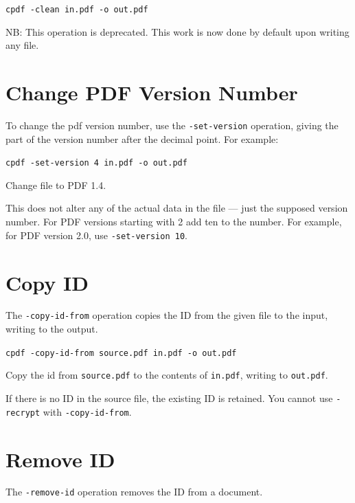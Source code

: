 \documentclass{book}
\begin{document}
  \begin{framed}
  \small\noindent\verb!cpdf -clean in.pdf -o out.pdf!
  \end{framed}

\noindent NB: This operation is deprecated. This work is now done by default upon writing any file.

   \section{Change PDF Version Number}
   \label{setversion}
   To change the pdf version number, use the \texttt{-set-version} operation,
giving the part of the version number after the decimal point. For example:

  \begin{framed}
  \small\noindent\verb!cpdf -set-version 4 in.pdf -o out.pdf!

  \vspace{2.5mm}
  \noindent Change file to PDF 1.4.
  \end{framed} 

  \noindent This does not alter any of the actual data in the file ---
just the supposed version number. For PDF versions starting with 2 add ten to the number. For example, for PDF version 2.0, use \texttt{-set-version 10}.

  \section{Copy ID}
  The \texttt{-copy-id-from} operation copies the ID from the given file to the
input, writing to the output.

  \begin{framed}
  \small\noindent\verb!cpdf -copy-id-from source.pdf in.pdf -o out.pdf!

  \vspace{2.5mm}
  \noindent Copy the id from \texttt{source.pdf} to the contents of \texttt{in.pdf}, writing to \texttt{out.pdf}.
  \end{framed}

  \noindent If there is no ID in the source file, the existing ID is retained. You cannot use \texttt{-recrypt} with \texttt{-copy-id-from}.

\section{Remove ID}
  The \texttt{-remove-id} operation removes the ID from a document.
\end{document}
